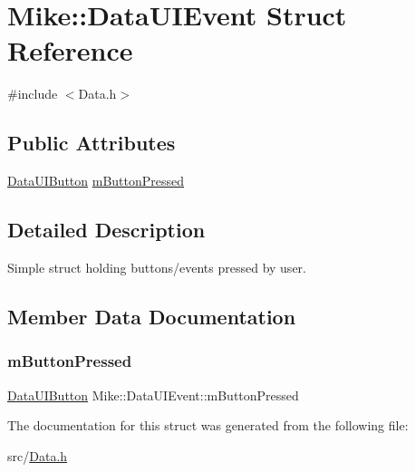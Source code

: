 \hypertarget{struct_mike_1_1_data_u_i_event}{}\section{Mike\+:\+:Data\+U\+I\+Event Struct Reference}
\label{struct_mike_1_1_data_u_i_event}


{\ttfamily \#include $<$Data.\+h$>$}

\subsection*{Public Attributes}
\begin{DoxyCompactItemize}
\item 
\hyperlink{namespace_mike_ac75044494e0b43141b5cefbcd63b7dde}{Data\+U\+I\+Button} \hyperlink{struct_mike_1_1_data_u_i_event_a0750106bd16c5494aa6402d16474b5b4}{m\+Button\+Pressed}
\end{DoxyCompactItemize}


\subsection{Detailed Description}
Simple struct holding buttons/events pressed by user. 

\subsection{Member Data Documentation}
\mbox{\label{struct_mike_1_1_data_u_i_event_a0750106bd16c5494aa6402d16474b5b4}} 
\subsubsection{\texorpdfstring{m\+Button\+Pressed}{mButtonPressed}}
{\footnotesize\ttfamily \hyperlink{namespace_mike_ac75044494e0b43141b5cefbcd63b7dde}{Data\+U\+I\+Button} Mike\+::\+Data\+U\+I\+Event\+::m\+Button\+Pressed}



The documentation for this struct was generated from the following file\+:\begin{DoxyCompactItemize}
\item 
src/\hyperlink{_data_8h}{Data.\+h}\end{DoxyCompactItemize}
